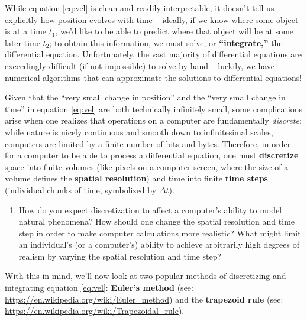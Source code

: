 \documentclass[11pt]{article}
\begin{document}
\noindent
While equation \ref{eq:vel} is clean and readily interpretable, it doesn't tell us explicitly how position evolves with time -- ideally, if we know where some object is at a time $t_1$, we'd like to be able to predict where that object will be at some later time $t_2$; to obtain this information, we must solve, or \textbf{``integrate,''} the differential equation. Unfortunately, the vast majority of differential equations are exceedingly difficult (if not impossible) to solve by hand -- luckily, we have numerical algorithms that can approximate the solutions to differential equations!

\medskip \noindent
Given that the ``very small change in position'' and the ``very small change in time'' in equation \ref{eq:vel} are both technically infinitely small, some complications arise when one realizes that operations on a computer are fundamentally \textit{discrete}: while nature is nicely continuous and smooth down to infinitesimal scales, computers are limited by a finite number of bits and bytes. Therefore, in order for a computer to be able to process a differential equation, one must \textbf{discretize} space into finite volumes (like pixels on a computer screen, where the size of a volume defines the \textbf{spatial resolution}) and time into finite \textbf{time steps} (individual chunks of time, symbolized by $\Delta t$).

\begin{enumerate}
    \item How do you expect discretization to affect a computer's ability to model natural phenomena? How should one change the spatial resolution and time step in order to make computer calculations more realistic? What might limit an individual's (or a computer's) ability to achieve arbitrarily high degrees of realism by varying the spatial resolution and time step?
\end{enumerate}

\noindent
With this in mind, we'll now look at two popular methods of discretizing and integrating equation \ref{eq:vel}: \textbf{Euler's method} (see: \url{https://en.wikipedia.org/wiki/Euler_method}) and the \textbf{trapezoid rule} (see: \url{https://en.wikipedia.org/wiki/Trapezoidal_rule}).
\end{document}
